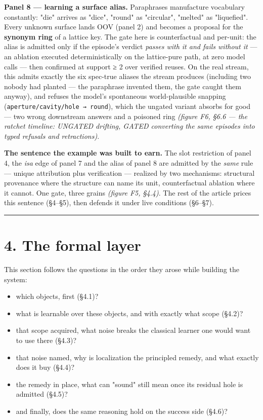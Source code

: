 \documentclass[11pt]{article}
\begin{document}
\textbf{Panel 8 — learning a surface alias.} Paraphrases manufacture vocabulary constantly: "die" arrives as "dice", "round" as "circular", "melted" as "liquefied". Every unknown surface lands OOV (panel 2) and becomes a proposal for the \textbf{synonym ring} of a lattice key. The gate here is counterfactual and per-unit: the alias is admitted only if the episode's verdict \emph{passes with it and fails without it} — an ablation executed deterministically on the lattice-pure path, at zero model calls — then confirmed at support ≥ 2 over verified reuses. On the real stream, this admits exactly the six spec-true aliases the stream produces (including two nobody had planted — the paraphrase invented them, the gate caught them anyway), and refuses the model's spontaneous world-plausible snapping (\texttt{aperture/cavity/hole → round}), which the ungated variant absorbs for good — two wrong downstream answers and a poisoned ring \emph{(figure F6, §6.6 — the ratchet timeline: UNGATED drifting, GATED converting the same episodes into typed refusals and retractions)}.

\textbf{The sentence the example was built to earn.} The slot restriction of panel 4, the \emph{isa} edge of panel 7 and the alias of panel 8 are admitted by the \emph{same} rule — unique attribution plus verification — realized by two mechanisms: structural provenance where the structure can name its unit, counterfactual ablation where it cannot. One gate, three grains \emph{(figure F5, §4.4)}. The rest of the article prices this sentence (§4–§5), then defends it under live conditions (§6–§7).

\medskip\hrule\medskip

\section*{4. The formal layer}

This section follows the questions in the order they arose while building the system:

\begin{itemize}
\item which objects, first (§4.1)?
\item what is learnable over these objects, and with exactly what scope (§4.2)?
\item that scope acquired, what noise breaks the classical learner one would want to use there (§4.3)?
\item that noise named, why is localization the principled remedy, and what exactly does it buy (§4.4)?
\item the remedy in place, what can "sound" still mean once its residual hole is admitted (§4.5)?
\item and finally, does the same reasoning hold on the success side (§4.6)?
\end{itemize}
\end{document}
